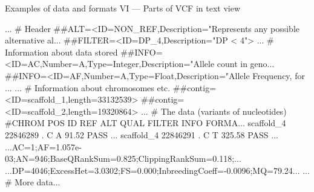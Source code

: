 \documentclass[compress, xelatex, 11pt, xcolor=svgnames, aspectratio=169, url={hyphens, lowtilde}]{beamer}
\begin{document}
\begin{frame}[fragile]{Examples of data and formats VI --- Parts of VCF in text view}
	\begin{spluscode}
    ... # Header
    ##ALT=<ID=NON_REF,Description="Represents any possible alternative al...
    ##FILTER=<ID=DP_4,Description="DP < 4">
    ... # Information about data stored
    ##INFO=<ID=AC,Number=A,Type=Integer,Description="Allele count in geno...
    ##INFO=<ID=AF,Number=A,Type=Float,Description="Allele Frequency, for ...
    ... # Information about chromosomes etc.
    ##contig=<ID=scaffold_1,length=33132539>
    ##contig=<ID=scaffold_2,length=19320864>
    ... # The data (variants of nucleotides)
    #CHROM  POS     ID      REF     ALT     QUAL    FILTER  INFO    FORMA...
    scaffold_4      22846289        .       C       A       91.52   PASS ...
    scaffold_4      22846291        .       C       T       325.58  PASS ...
    ...AC=1;AF=1.057e-03;AN=946;BaseQRankSum=0.825;ClippingRankSum=0.118;...
    ...DP=4046;ExcessHet=3.0302;FS=0.000;InbreedingCoeff=-0.0096;MQ=79.24...
    ... # More data...
	\end{spluscode}
\end{frame}
\end{document}
